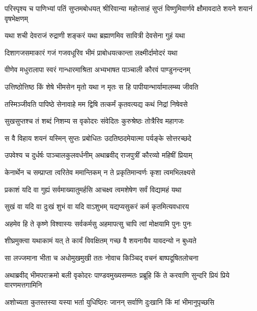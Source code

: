\threelineshloka
{परिस्पृश्य च पाणिभ्यां पतिं सुप्तमबोधयत्}
{श्रीरिवान्या महोत्साहं सुप्तं विष्णुमिवार्णवे}
{क्षौमावदाते शयने शयानं वृषभेक्षणम्}


\twolineshloka
{यथा शची देवराजं रुद्राणी शङ्करं यथा}
{ब्रह्माणमिव सावित्री देवसेना गुहं यथा}


\twolineshloka
{दिशागजसमाकारं गजं गजवधूरिव}
{भीमं प्राबोधयत्कान्ता लक्ष्मीर्दामोदरं यथा}


\twolineshloka
{वीणेव मधुरालापा स्वरं गान्धारमाश्रिता}
{अभ्यभाषत पाञ्चाली कौरवं पाण्डुनन्दनम्}


\twolineshloka
{उत्तिष्ठोत्तिष्ठ किं शेषे भीमसेन मृतो यथा}
{न मृतः स हि पापीयान्भार्यामालम्ब्य जीवति}


\twolineshloka
{तस्मिञ्जीवति पापिष्ठे सेनावाहे मम द्विषि}
{तत्कर्मं कृतवत्यद्य कथं निद्रां निषेवसे}



\twolineshloka
{सुखसुप्तश्च तं शब्दं निशम्य स वृकोदरः}
{संवेदितः कुरुश्रेष्ठः तोत्रैरिव महागजः}


\twolineshloka
{स वै विहाय शयनं यस्मिन् सुप्तः प्रबोधितः}
{उदतिष्ठदमेयात्मा पर्यङ्के सोत्तरच्छदे}


\twolineshloka
{उपवेश्य च दुर्धर्षः पाञ्चालकुलवर्धनीम्}
{अथाब्रवीद् राजपुत्रीं कौरव्यो महिषीं प्रियाम्}


\twolineshloka
{केनार्थेन च सम्प्राप्ता त्वरितेव ममान्तिकम्}
{न ते प्रकृतिमान्वर्णः कृशा त्वमभिलक्ष्यसे}


\twolineshloka
{प्रकाशं यदि वा गुह्यं सर्वमाख्यातुमर्हसि}
{आचक्ष्व त्वमशेषेण सर्वं विद्यामहं यथा}


\twolineshloka
{सुखं वा यदि वा दुःखं शुभं वा यदि वाऽशुभम्}
{यद्यप्यसुकरं कर्म कृतमित्यवधारय}


\twolineshloka
{अहमेव हि ते कृष्णे विश्वास्यः सर्वकर्मसु}
{अहमापत्सु चापि त्वां मोक्षयामि पुनः पुनः}


\twolineshloka
{शीघ्रमुक्त्वा यथाकामं यत् ते कार्यं विवक्षितम्}
{गच्छ वै शयनायैव यावदन्यो न बुध्यते}



\twolineshloka
{सा लज्जमाना भीता च अधोमुखमुखी ततः}
{नोवाच किञ्चिद् वचनं बाष्पदूषितलोचना}


\fourlineindentedshloka
{अथाब्रवीद् भीमपराक्रमो बली}
{वृकोदरः पाण्डवमुख्यसम्मतः}
{प्रब्रूहि किं ते करवाणि सुन्दरि}
{प्रियं प्रिये वारणमत्तगामिनि}




\twolineshloka
{अशोच्यता कुतस्तस्या यस्या भर्ता युधिष्ठिरः}
{जानन् सर्वाणि दुःखानि किं मां भीमानुपृच्छसि}


